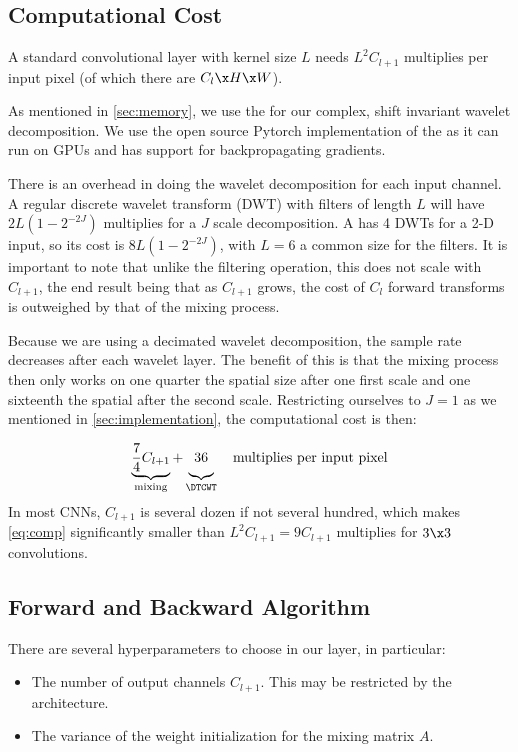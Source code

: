 \subsection{Computational Cost}\label{sec:computation}
A standard convolutional layer with kernel size $L$ needs $L^2C_{l+1}$
multiplies per input pixel (of which there are $C_{l}\x H\x W$).

As mentioned in \autoref{sec:memory}, we use the \DTCWT for our complex, shift
invariant wavelet decomposition. We use the open source Pytorch implementation
of the \DTCWT \cite{cotter_pytorch_2018} as it can run on GPUs and
has support for backpropagating gradients.

There is an overhead in doing the wavelet decomposition for each input channel. A
regular discrete wavelet transform (DWT) with filters of length $L$ will have
$2L\left(1-2^{-2J}\right)$ multiplies for a $J$ scale decomposition. A \DTCWT
has 4 DWTs for a 2-D input, so its cost is $8L\left(1-2^{-2J}\right)$, with
$L=6$ a common size for the filters. It is important to note that unlike the
filtering operation, this does not scale with $C_{l+1}$, the end result being that as
$C_{l+1}$ grows, the cost of $C_l$ forward transforms is outweighed by that of the mixing
process.

Because we are using a decimated wavelet decomposition, the sample rate decreases after each
wavelet layer. The benefit of this is that the mixing process then only works on
one quarter the spatial size after one first scale and one sixteenth the spatial
after the second scale. Restricting ourselves to $J=1$ as we mentioned in
\autoref{sec:implementation}, the computational cost is then:

\begin{equation}
  \underbrace{ \frac{7}{4}C_{l+1} }_{\textrm{mixing}} +
  \underbrace{\vphantom{\frac{7}{4}} 36}_{\textrm{\DTCWT}} \quad
  \textrm{multiplies per input pixel}\label{eq:comp}
\end{equation}
In most CNNs, $C_{l+1}$ is several dozen if not several
hundred, which makes \autoref{eq:comp} significantly smaller than
$L^2C_{l+1}=9C_{l+1}$ multiplies for $3\x 3$ convolutions.

\subsection{Forward and Backward Algorithm}
There are several hyperparameters to choose in our layer, in particular:
\begin{itemize}
  \item The number of output channels $C_{l+1}$. This may be restricted by the
    architecture.
  \item The variance of the weight initialization for the mixing matrix $A$.
\end{itemize}

